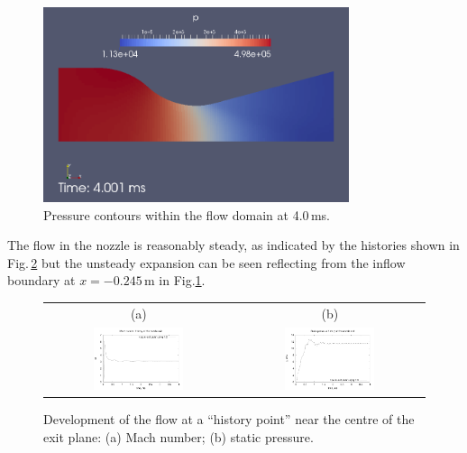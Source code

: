 \begin{figure}[htbp]
\begin{center}
\includegraphics[width=0.8\textwidth]{../2D/back-nozzle/back-p-field.png}
\end{center}
\caption{Pressure contours within the flow domain at 4.0\,ms.}
\label{back-pressure-contours-fig}
\end{figure}

The flow in the nozzle is reasonably steady, as indicated by the histories
shown in Fig.\,\ref{back-transient-fig} but the unsteady expansion can 
be seen reflecting from the inflow boundary at $x = -0.245$\,m 
in Fig.\ref{back-pressure-contours-fig}.

\begin{figure}[htbp]
\begin{center}
\begin{tabular}{cc}
(a) & (b) \\
\includegraphics[width=0.5\textwidth]{../2D/back-nozzle/back_history_M.pdf} &
\includegraphics[width=0.5\textwidth]{../2D/back-nozzle/back_history_p.pdf}
\end{tabular}
\end{center}
\caption{Development of the flow at a ``history point'' near
         the centre of the exit plane:
         (a) Mach number;
         (b) static pressure.}
\label{back-transient-fig}
\end{figure}

